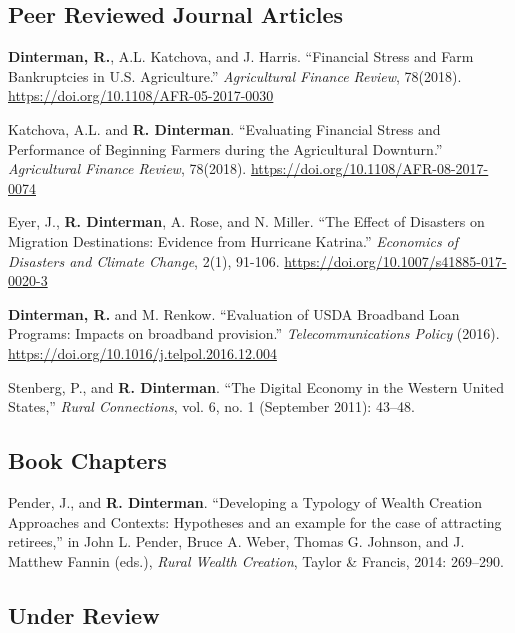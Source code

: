 \documentclass[letterpaper]{article}
\renewenvironment{itemize}{
  \begin{list}{}{
    \setlength{\leftmargin}{1.5em}
  }
}{
  \end{list}
}
\begin{document}
\subsection*{Peer Reviewed Journal Articles}
\begin{itemize}
\item \textbf{Dinterman, R.}, A.L. Katchova, and J. Harris. ``Financial Stress and Farm Bankruptcies in U.S. Agriculture.'' \emph{Agricultural Finance Review}, 78(2018). \href{https://doi.org/10.1108/AFR-05-2017-0030}{https://doi.org/10.1108/AFR-05-2017-0030}
\item Katchova, A.L. and \textbf{R. Dinterman}. ``Evaluating Financial Stress and Performance of Beginning Farmers during the Agricultural Downturn.'' \emph{Agricultural Finance Review}, 78(2018). \href{https://doi.org/10.1108/AFR-08-2017-0074}{https://doi.org/10.1108/AFR-08-2017-0074}
\item Eyer, J., \textbf{R. Dinterman}, A. Rose, and N. Miller. ``The Effect of Disasters on Migration Destinations: Evidence from Hurricane Katrina.'' \emph{Economics of Disasters and Climate Change}, 2(1), 91-106. \href{https://doi.org/10.1007/s41885-017-0020-3}{https://doi.org/10.1007/s41885-017-0020-3}
\item \textbf{Dinterman, R.} and M. Renkow. ``Evaluation of USDA Broadband Loan Programs: Impacts on broadband provision.'' \emph{Telecommunications Policy} (2016). \href{https://doi.org/10.1016/j.telpol.2016.12.004}{https://doi.org/10.1016/j.telpol.2016.12.004}
\item Stenberg, P., and \textbf{R. Dinterman}. ``The Digital Economy in the Western United States,'' \emph{Rural Connections}, vol. 6, no. 1 (September 2011): 43--48.
\end{itemize}

\subsection*{Book Chapters}

\begin{itemize}
\item Pender, J., and \textbf{R. Dinterman}. ``Developing a Typology of Wealth Creation Approaches and Contexts: Hypotheses and an example for the case of attracting retirees,'' in  John L. Pender, Bruce A. Weber, Thomas G. Johnson, and J. Matthew Fannin (eds.), \emph{Rural Wealth Creation}, Taylor \& Francis, 2014: 269--290.
\end{itemize}

\subsection*{Under Review}
\end{document}
